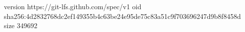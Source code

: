 version https://git-lfs.github.com/spec/v1
oid sha256:4d2832768dc2ef149355b4c63be24e95de75c83a51c9f703696247d9b8f8458d
size 349692
